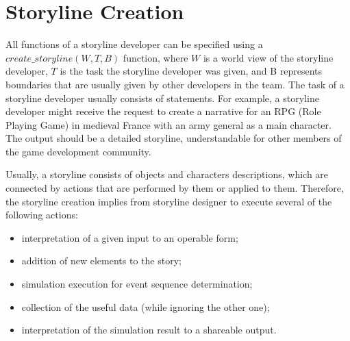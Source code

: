 \section{Storyline Creation}

All functions of a storyline developer can be specified using a \(create\_storyline(W,T,B)\) function, where $W$ is a world view of the storyline developer, $T$ is the task the storyline developer was given, and B represents boundaries that are usually given by other developers in the team.
 The task of a storyline developer usually consists of statements.
 For example, a storyline developer might receive the request to create a narrative for an RPG (Role Playing Game) in medieval France with an army general as a main character. The output should be a detailed storyline, understandable for other members of the game development community.

Usually, a storyline consists of objects and characters descriptions, which are connected by actions that are performed by them or applied to them. Therefore, the storyline creation implies from storyline designer to execute several of the following actions:
\begin{itemize}
 \item interpretation of a given input to an operable form;
 \item addition of new elements to the story;
 \item simulation execution for event sequence determination;
 \item collection of the useful data (while ignoring the other one);
 \item interpretation of the simulation result to a shareable output.
\end{itemize}

